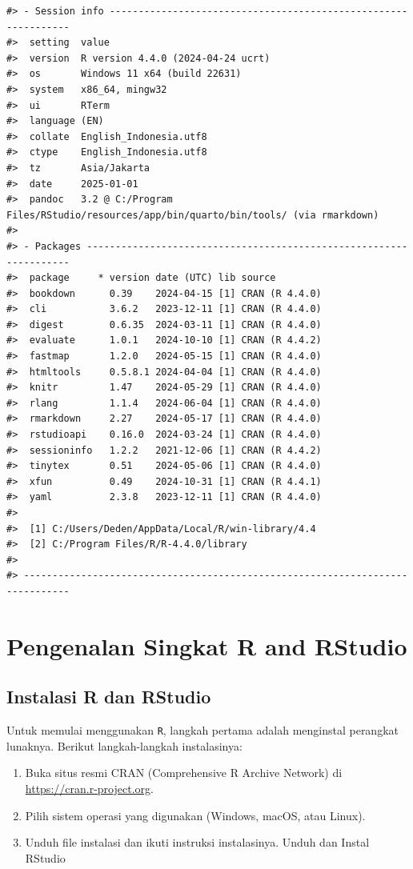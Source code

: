 \documentclass[
  oneside]{book}
\begin{document}
\begin{verbatim}
#> - Session info ---------------------------------------------------------------
#>  setting  value
#>  version  R version 4.4.0 (2024-04-24 ucrt)
#>  os       Windows 11 x64 (build 22631)
#>  system   x86_64, mingw32
#>  ui       RTerm
#>  language (EN)
#>  collate  English_Indonesia.utf8
#>  ctype    English_Indonesia.utf8
#>  tz       Asia/Jakarta
#>  date     2025-01-01
#>  pandoc   3.2 @ C:/Program Files/RStudio/resources/app/bin/quarto/bin/tools/ (via rmarkdown)
#> 
#> - Packages -------------------------------------------------------------------
#>  package     * version date (UTC) lib source
#>  bookdown      0.39    2024-04-15 [1] CRAN (R 4.4.0)
#>  cli           3.6.2   2023-12-11 [1] CRAN (R 4.4.0)
#>  digest        0.6.35  2024-03-11 [1] CRAN (R 4.4.0)
#>  evaluate      1.0.1   2024-10-10 [1] CRAN (R 4.4.2)
#>  fastmap       1.2.0   2024-05-15 [1] CRAN (R 4.4.0)
#>  htmltools     0.5.8.1 2024-04-04 [1] CRAN (R 4.4.0)
#>  knitr         1.47    2024-05-29 [1] CRAN (R 4.4.0)
#>  rlang         1.1.4   2024-06-04 [1] CRAN (R 4.4.0)
#>  rmarkdown     2.27    2024-05-17 [1] CRAN (R 4.4.0)
#>  rstudioapi    0.16.0  2024-03-24 [1] CRAN (R 4.4.0)
#>  sessioninfo   1.2.2   2021-12-06 [1] CRAN (R 4.4.2)
#>  tinytex       0.51    2024-05-06 [1] CRAN (R 4.4.0)
#>  xfun          0.49    2024-10-31 [1] CRAN (R 4.4.1)
#>  yaml          2.3.8   2023-12-11 [1] CRAN (R 4.4.0)
#> 
#>  [1] C:/Users/Deden/AppData/Local/R/win-library/4.4
#>  [2] C:/Program Files/R/R-4.4.0/library
#> 
#> ------------------------------------------------------------------------------
\end{verbatim}

\section{Pengenalan Singkat R and RStudio}\label{pengenalan-singkat-r-and-rstudio}

\subsection*{Instalasi R dan RStudio}\label{instalasi-r-dan-rstudio}

Untuk memulai menggunakan \texttt{R}, langkah pertama adalah
menginstal perangkat lunaknya. Berikut langkah-langkah instalasinya:

\begin{enumerate}
\def\labelenumi{\arabic{enumi}.}
\item
  Buka situs resmi CRAN (Comprehensive R Archive Network) di
  \url{https://cran.r-project.org}.
\item
  Pilih sistem operasi yang digunakan (Windows, macOS, atau Linux).
\item
  Unduh file instalasi dan ikuti instruksi instalasinya. Unduh dan
  Instal RStudio
\end{enumerate}
\end{document}
